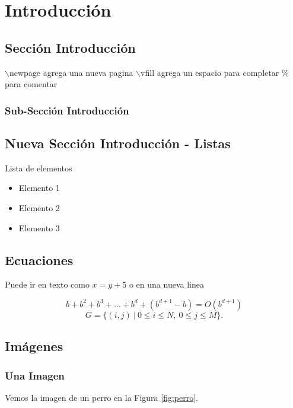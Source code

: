 \chapter{Introducción}
\label{intro} %

\section{Sección Introducción}
$\backslash $newpage agrega una nueva pagina
$\backslash $vfill agrega un espacio para completar
\% para comentar

\subsection{Sub-Sección Introducción}


\section{Nueva Sección Introducción - Listas}

Lista de elementos
\begin{itemize}
	\item Elemento 1
	
	\item Elemento 2
	
	\item Elemento 3
	
\end{itemize}

\section{Ecuaciones}

Puede ir en texto como $x = y + 5$ o en una nueva linea

\[ b + b^2 + b^3 + \dots + b^d + (b^{d+1} - b) =   O(b^{d+1}) \]
\[G = {\{(i, j) \ | \ 0 \leq i \leq N,\ 0 \leq j \leq M \}}\text{.}\]

\section{Imágenes}


\subsection{Una Imagen}

Vemos la imagen de un perro en la Figura \ref{fig:perro}.

